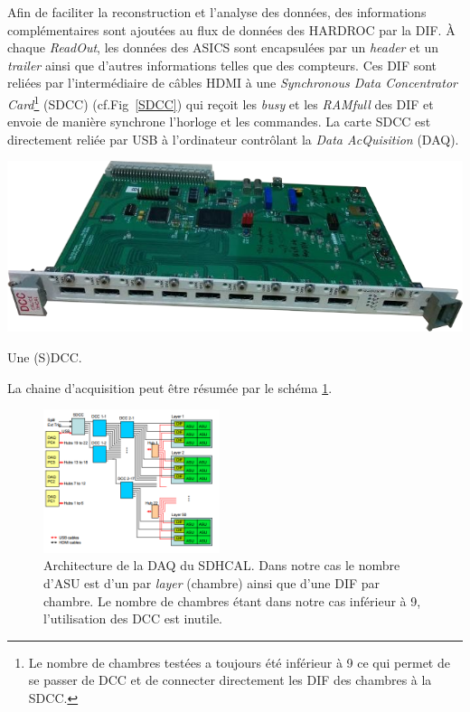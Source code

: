 Afin de faciliter la reconstruction et l'analyse des données, des informations complémentaires sont ajoutées au flux de données des HARDROC par la DIF. À chaque \textit{ReadOut}, les données des ASICS sont encapsulées par un \textit{header} et un \textit{trailer} ainsi que d'autres informations telles que des compteurs. Ces DIF sont reliées par l'intermédiaire de câbles HDMI à une \textit{Synchronous Data Concentrator Card}\footnote{Le nombre de chambres testées a toujours été inférieur à \num{9} ce qui permet de se passer de DCC et de connecter directement les DIF des chambres à la SDCC.} (SDCC) (cf.Fig~\ref{SDCC}) \cite{Baulieu:2015pfa} qui reçoit les \textit{busy} et les \textit{RAMfull} des DIF et envoie de manière synchrone l'horloge et les commandes. La carte SDCC est directement reliée par USB à l'ordinateur contrôlant la \textit{Data AcQuisition} (DAQ).
\marginpar
{
	\centering
	\includegraphics[width=\marginparwidth]{GLA/SDCC.png}
	\captionsetup{type=figure}\caption{Une (S)DCC.}
	\label{SDCC}
}
La chaine d'acquisition peut être résumée par le schéma \ref{chaine}. 
\begin{figure}[ht!]
	\centering
	\includegraphics[width=0.46\textwidth]{GLA/chaine.png}
	\captionsetup{type=figure}\caption{Architecture de la DAQ du SDHCAL. Dans notre cas le nombre d'ASU est d'un par \textit{layer} (chambre) ainsi que d'une DIF par chambre. Le nombre de chambres étant dans notre cas inférieur à \num{9}, l'utilisation des DCC est inutile.}
	\label{chaine}
\end{figure}

